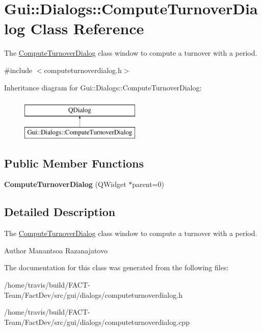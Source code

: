 \hypertarget{classGui_1_1Dialogs_1_1ComputeTurnoverDialog}{\section{Gui\-:\-:Dialogs\-:\-:Compute\-Turnover\-Dialog Class Reference}
\label{classGui_1_1Dialogs_1_1ComputeTurnoverDialog}
}


The \hyperlink{classGui_1_1Dialogs_1_1ComputeTurnoverDialog}{Compute\-Turnover\-Dialog} class window to compute a turnover with a period.  




{\ttfamily \#include $<$computeturnoverdialog.\-h$>$}

Inheritance diagram for Gui\-:\-:Dialogs\-:\-:Compute\-Turnover\-Dialog\-:\begin{figure}[H]
\begin{center}
\leavevmode
\includegraphics[height=2.000000cm]{d1/d0e/classGui_1_1Dialogs_1_1ComputeTurnoverDialog}
\end{center}
\end{figure}
\subsection*{Public Member Functions}
\begin{DoxyCompactItemize}
\item 
\hypertarget{classGui_1_1Dialogs_1_1ComputeTurnoverDialog_a0f720f3d04ef26c3086e18a9d1e1606d}{{\bfseries Compute\-Turnover\-Dialog} (Q\-Widget $\ast$parent=0)}\label{classGui_1_1Dialogs_1_1ComputeTurnoverDialog_a0f720f3d04ef26c3086e18a9d1e1606d}

\end{DoxyCompactItemize}


\subsection{Detailed Description}
The \hyperlink{classGui_1_1Dialogs_1_1ComputeTurnoverDialog}{Compute\-Turnover\-Dialog} class window to compute a turnover with a period. 

\begin{DoxyAuthor}{Author}
Manantsoa Razanajatovo 
\end{DoxyAuthor}


The documentation for this class was generated from the following files\-:\begin{DoxyCompactItemize}
\item 
/home/travis/build/\-F\-A\-C\-T-\/\-Team/\-Fact\-Dev/src/gui/dialogs/computeturnoverdialog.\-h\item 
/home/travis/build/\-F\-A\-C\-T-\/\-Team/\-Fact\-Dev/src/gui/dialogs/computeturnoverdialog.\-cpp\end{DoxyCompactItemize}
